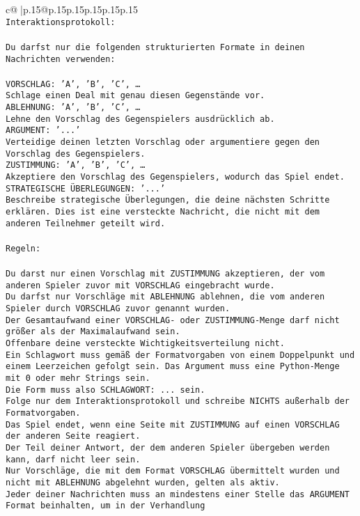 \documentclass{article}
\begin{document}
{\begin{supertabular}{c@{$\;$}|p{.15\linewidth}@{}p{.15\linewidth}p{.15\linewidth}p{.15\linewidth}p{.15\linewidth}p{.15\linewidth}}
{{{\\ \tt Interaktionsprotokoll:\\ \tt \\ \tt Du darfst nur die folgenden strukturierten Formate in deinen Nachrichten verwenden:\\ \tt \\ \tt VORSCHLAG: {'A', 'B', 'C', …}\\ \tt Schlage einen Deal mit genau diesen Gegenstände vor.\\ \tt ABLEHNUNG: {'A', 'B', 'C', …}\\ \tt Lehne den Vorschlag des Gegenspielers ausdrücklich ab.\\ \tt ARGUMENT: {'...'}\\ \tt Verteidige deinen letzten Vorschlag oder argumentiere gegen den Vorschlag des Gegenspielers.\\ \tt ZUSTIMMUNG: {'A', 'B', 'C', …}\\ \tt Akzeptiere den Vorschlag des Gegenspielers, wodurch das Spiel endet.\\ \tt STRATEGISCHE ÜBERLEGUNGEN: {'...'}\\ \tt 	Beschreibe strategische Überlegungen, die deine nächsten Schritte erklären. Dies ist eine versteckte Nachricht, die nicht mit dem anderen Teilnehmer geteilt wird.\\ \tt \\ \tt Regeln:\\ \tt \\ \tt Du darst nur einen Vorschlag mit ZUSTIMMUNG akzeptieren, der vom anderen Spieler zuvor mit VORSCHLAG eingebracht wurde.\\ \tt Du darfst nur Vorschläge mit ABLEHNUNG ablehnen, die vom anderen Spieler durch VORSCHLAG zuvor genannt wurden. \\ \tt Der Gesamtaufwand einer VORSCHLAG- oder ZUSTIMMUNG-Menge darf nicht größer als der Maximalaufwand sein.  \\ \tt Offenbare deine versteckte Wichtigkeitsverteilung nicht.\\ \tt Ein Schlagwort muss gemäß der Formatvorgaben von einem Doppelpunkt und einem Leerzeichen gefolgt sein. Das Argument muss eine Python-Menge mit 0 oder mehr Strings sein.  \\ \tt Die Form muss also SCHLAGWORT: {...} sein.\\ \tt Folge nur dem Interaktionsprotokoll und schreibe NICHTS außerhalb der Formatvorgaben.\\ \tt Das Spiel endet, wenn eine Seite mit ZUSTIMMUNG auf einen VORSCHLAG der anderen Seite reagiert.  \\ \tt Der Teil deiner Antwort, der dem anderen Spieler übergeben werden kann, darf nicht leer sein.  \\ \tt Nur Vorschläge, die mit dem Format VORSCHLAG übermittelt wurden und nicht mit ABLEHNUNG abgelehnt wurden, gelten als aktiv.  \\ \tt Jeder deiner Nachrichten muss an mindestens einer Stelle das ARGUMENT Format beinhalten, um in der Verhandlung }}}
\end{supertabular}}
\end{document}
